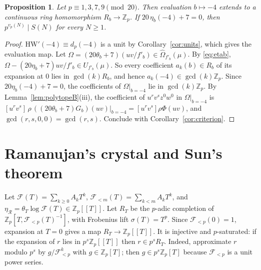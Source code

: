 \documentclass[11pt]{amsart}
\newtheorem{proposition}[theorem]{Proposition}
\theoremstyle{definition}
\theoremstyle{remark}
\newcommand{\Zp}{\mathbb{Z}_p}
\newcommand{\cF}{\mathcal{F}}
\begin{document}
\begin{proposition}\label{prop:onenumber}
Let $p\equiv1,3,7,9\pmod{20}$. Then evaluation $b\mapsto-4$ extends to a continuous ring
homomorphism $R_b\to\Zp$. If $20\,\eta_b(-4)+7=0$, then $p^{v_p(N)}\mid S(N)$ for every $N\ge1$.
\end{proposition}
\begin{proof}
$\mathrm{HW}'(-4)\equiv d_p(-4)$ is a unit by Corollary~\ref{cor:units}, which gives the evaluation map.
Let $\Omega=(20\theta_b+7)(uv/f'_b)\in\widehat\Omega_{f'_b}(\mu)$. By \eqref{eq:etab},
$\Omega-(20\eta_b+7)uv/f'_b\in U_{f'_b}(\mu)$. So every coefficient $a_k(b)\in R_b$ of its
expansion at $0$ lies in $\gcd(k)R_b$, and hence $a_k(-4)\in\gcd(k)\Zp$. Since
$20\eta_b(-4)+7=0$, the coefficients of $\Omega|_{b=-4}$ lie in $\gcd(k)\Zp$. By
Lemma~\ref{lem:polytopeB}(iii), the coefficient of $u^rv^sz^0w^0$ in $\Omega|_{b=-4}$ is
$[u^rv^s]\,\rho\,((20\theta_b+7)G_b)(uv)|_{b=-4}=[u^rv^s]\rho\Phi(uv)$, and
$\gcd(r,s,0,0)=\gcd(r,s)$. Conclude with Corollary~\ref{cor:criterion}.
\end{proof}

\section{Ramanujan's crystal and Sun's theorem}\label{sec:ramanujan}

Let $\cF(T)=\sum_{k\ge0}A_kT^k$, $\cF_{<m}(T)=\sum_{k<m}A_kT^k$, and
$\eta_{\mathcal R}=\theta_T\log\cF(T)\in\Zp[[T]]$. Let $R_T$ be the $p$-adic completion of
$\Zp[T,\cF_{<p}(T)^{-1}]$, with Frobenius lift $\sigma(T)=T^p$. Since $\cF_{<p}(0)=1$, expansion at
$T=0$ gives a map $R_T\to\Zp[[T]]$. It is injective and $p$-saturated: if the expansion of $r$
lies in $p^s\Zp[[T]]$ then $r\in p^sR_T$. Indeed, approximate $r$ modulo $p^s$ by
$g/\cF_{<p}^k$ with $g\in\Zp[T]$; then $g\in p^s\Zp[T]$ because $\cF_{<p}$ is a unit power series.
\end{document}
